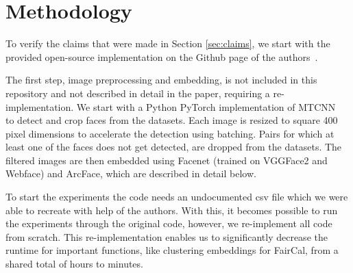 

\section{Methodology}

To verify the claims that were made in Section \ref{sec:claims}, we start with the provided open-source implementation on the Github page of the authors~\cite{salvador_2021}.

The first step, image preprocessing and embedding, is not included in this repository and not described in detail in the paper, requiring a re-implementation.
We start with a Python PyTorch implementation of MTCNN~\cite{facenetpytorch,zhang2016jointmtcnn} to detect and crop faces from the datasets.
Each image is resized to square 400 pixel dimensions to accelerate the detection using batching.
Pairs for which at least one of the faces does not get detected, are dropped from the datasets.
The filtered images are then embedded using Facenet (trained on VGGFace2 and Webface) and ArcFace, which are described in detail below.

To start the experiments the code needs an undocumented csv file which we were able to recreate with help of the authors.
With this, it becomes possible to run the experiments through the original code, however, we re-implement all code from scratch.
This re-implementation enables us to significantly decrease the runtime for important functions, like clustering embeddings for FairCal, from a shared total of hours to minutes.

